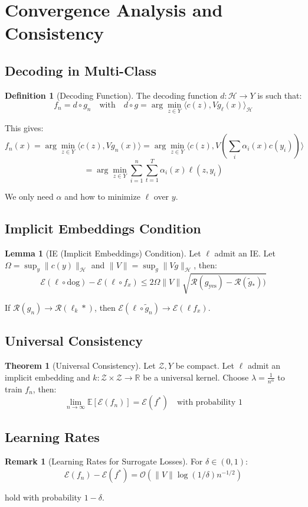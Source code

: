 \documentclass[12pt,a4paper]{article}
\theoremstyle{definition}
\newtheorem{definition}{Definition}[section]
\newtheorem{theorem}{Theorem}[section]
\newtheorem{lemma}{Lemma}[section]
\newtheorem{remark}{Remark}[section]
\begin{document}
\newpage


\section{Convergence Analysis and Consistency}

\subsection{Decoding in Multi-Class}

\begin{definition}[Decoding Function]
The decoding function $d: \mathcal{H} \to Y$ is such that:
\[
f_n = d \circ g_n \quad \text{with} \quad d \circ g = \arg\min_{z \in Y} \langle c(z), V g_\ell(x) \rangle_\mathcal{H}
\]

This gives:
\[
f_n(x) = \arg\min_{z \in Y} \langle c(z), V g_n(x) \rangle = \arg\min_{z \in Y} \langle c(z), V \left(\sum_i \alpha_i(x) c(y_i)\right) \rangle
\]
\[
= \arg\min_{z \in Y} \sum_{i=1}^n \sum_{t=1}^T \alpha_i(x) \ell(z, y_i)
\]

We only need $\alpha$ and how to minimize $\ell$ over $y$.
\end{definition}

\subsection{Implicit Embeddings Condition}

\begin{lemma}[IE (Implicit Embeddings) Condition]
Let $\ell$ admit an IE. Let $\Omega = \sup_{y} \|c(y)\|_\mathcal{H}$ and $\|V\| = \sup_{g} \|Vg\|_\mathcal{H}$, then:
\[
\mathcal{E}(\ell \circ \text{dog}) - \mathcal{E}(\ell \circ f_x) \leq 2\Omega \|V\| \sqrt{\mathcal{R}(g_\text{yes}) - \mathcal{R}(\tilde{g}_*))}
\]

If $\mathcal{R}(g_n) \to \mathcal{R}(\ell_k*)$, then $\mathcal{E}(\ell \circ \tilde{g}_n) \to \mathcal{E}(\ell f_x)$.
\end{lemma}

\subsection{Universal Consistency}

\begin{theorem}[Universal Consistency]
Let $\mathcal{Z}, Y$ be compact. Let $\ell$ admit an implicit embedding and $k: \mathcal{Z} \times \mathcal{Z} \to \mathbb{R}$ be a universal kernel. Choose $\lambda = \frac{1}{n^\alpha}$ to train $f_n$, then:
\[
\lim_{n \to \infty} \mathbb{E}[\mathcal{E}(f_n)] = \mathcal{E}(f^*) \quad \text{with probability } 1
\]
\end{theorem}

\subsection{Learning Rates}

\begin{remark}[Learning Rates for Surrogate Losses]
For $\delta \in (0,1)$:
\[
\mathcal{E}(f_n) - \mathcal{E}(f^*) = \mathcal{O}(\|V\| \log(1/\delta) n^{-1/2})
\]

hold with probability $1-\delta$.
\end{remark}
\end{document}
